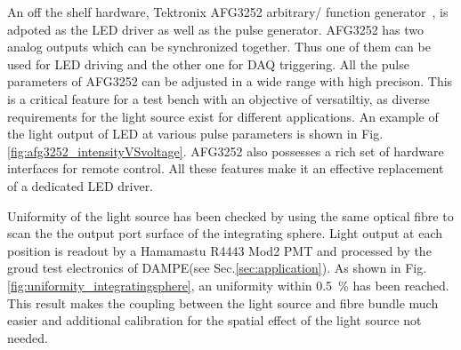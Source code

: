 \documentclass[review,number,sort&compress]{elsarticle}
\begin{document}
An off the shelf hardware, Tektronix AFG3252 arbitrary/ function generator~\cite{afg3252}, is adpoted as the LED driver as well as the pulse generator.
AFG3252 has two analog outputs which can be synchronized together.
Thus one of them can be used for LED driving and the other one for DAQ triggering.
All the pulse parameters of AFG3252 can be adjusted in a wide range with high precison.%
This is a critical feature for a test bench with an objective of versatiltiy, as diverse requirements for the light source exist for different applications.
An example of the light output of LED at various pulse parameters is shown in Fig.\ref{fig:afg3252_intensityVSvoltage}.
AFG3252 also possesses a rich set of hardware interfaces for remote control.
All these features make it an effective replacement of a dedicated LED driver. 

Uniformity of the light source has been checked by using the same optical fibre to scan the the output port surface of the integrating sphere.
Light output at each position is readout by a Hamamastu R4443 Mod2 PMT and processed by the groud test electronics of DAMPE(see Sec.\ref{sec:application}). 
As shown in Fig.\ref{fig:uniformity_integratingsphere}, an uniformity within \textpm\SI{0.5}{\percent} has been reached.
This result makes the coupling between the light source and fibre bundle much easier and additional calibration for the spatial effect of the light source not needed. 

\end{document}
